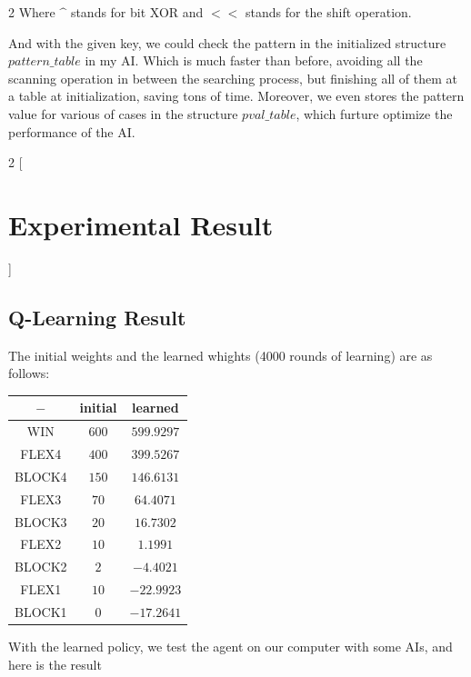 \documentclass[a4paper, 12pt]{article} %
\begin{document}
\begin{multicols}{2}
		Where $\^{}$ stands for bit XOR and $<<$ stands for the shift operation.
		
		And with the given key, we could check the pattern in the initialized structure $pattern\_table$ in my AI. Which is much faster than before, avoiding all the scanning operation in between the searching process, but finishing all of them at a table at initialization, saving tons of time. Moreover, we even stores the pattern value for various of cases in the structure $pval\_table$, which furture optimize the performance of the AI.
		
	\end{multicols}

	\bigskip
	
	\begin{multicols}{2}
		[
		\section{Experimental Result}
		]
		
		\subsection{Q-Learning Result}
		
		The initial weights and the learned whights (4000 rounds of learning) are as follows:
		
		\begin{center}
			\begin{tabular}{|c|c|c|}
				\hline$-$ & initial & learned\\
				\hline \hline WIN & $600$ & $599.9297$\\
				\hline \hline FLEX4 & $400$ & $399.5267$\\
				\hline \hline BLOCK4 & $150$ & $ 146.6131$\\
				\hline \hline FLEX3 & $70$ & $64.4071$\\
				\hline \hline BLOCK3 & $20$ & $16.7302$\\
				\hline \hline FLEX2 & $10$ & $1.1991$\\
				\hline \hline BLOCK2 & $2$ & $-4.4021$\\
				\hline \hline FLEX1 & $10$ & $-22.9923$\\
				\hline \hline BLOCK1 & $0$ & $-17.2641$\\
				\hline
			\end{tabular}
		\end{center}
		
		With the learned policy, we test the agent on our computer with some AIs, and here is the result
		

\end{multicols}
\end{document}

